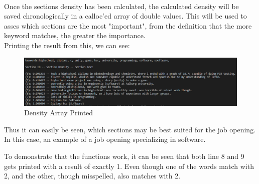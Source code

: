 \\
Once the sections density has been calculated, the calculated density will be saved chronologically in a calloc'ed array of double values. 
This will be used to asses which sections are the most "important", from the definition that the more keyword matches, the greater the importance.
\\
Printing the result from this, we can see:
\begin{figure}[H]
  \centering
  \includegraphics[scale = 0.6]{figures/density_example.png}
  \caption{Density Array Printed}
\end{figure}
Thus it can easily be seen, which sections may be best suited for the job opening. 
In this case, an example of a job opening specializing in software.

To demonstrate that the functions work, it can be seen that both line 8 and 9 gets printed with a result of exactly 1.
Even though one of the words match with 2, and the other, though misspelled, also matches with 2.

